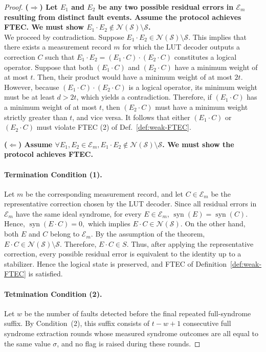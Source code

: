 \begin{proof}
\textbf{($\Rightarrow$) 
Let $E_1$ and $E_2$ be any two possible residual errors in $\mathcal{E}_{m}$ resulting from distinct fault events. Assume the protocol achieves FTEC. We must show $E_1 \cdot E_2 \notin \mathcal{N(S)} \setminus \mathcal{S}$.}\\
We proceed by contradiction. Suppose $E_1 \cdot E_2 \in \mathcal{N(S)} \setminus \mathcal{S}$.  This implies that there exists a measurement record $m$ for which the LUT decoder outputs a correction $C$ such that $E_1 \cdot E_2 = (E_1 \cdot C) \cdot (E_2 \cdot C)$ constitutes a logical operator. Suppose that both $(E_1 \cdot C)$ and $(E_2 \cdot C)$ have a minimum weight of at most $t$. Then, their product would have a minimum weight of at most $2t$. However, because $(E_1 \cdot C) \cdot (E_2 \cdot C)$ is a logical operator, its minimum weight must be at least $d > 2t$, which yields a contradiction. Therefore, if $(E_1 \cdot C)$ has a minimum weight of at most $t$, then $(E_2 \cdot C)$ must have a minimum weight strictly greater than $t$, and vice versa. It follows that either $(E_1 \cdot C)$ or $(E_2 \cdot C)$ must violate FTEC (2) of Def.~\ref{def:weak-FTEC}.

\textbf{($\Leftarrow$) 
Assume $\forall E_1 , E_2 \in \mathcal{E}_m,  E_1 \cdot E_2 \notin  \mathcal{N(S)} \setminus \mathcal{S}$. We must show the protocol achieves FTEC.}
\paragraph{Termination Condition (1).}
Let $m$ be the corresponding
    measurement record, and let $C\in\mathcal{E}_m$ be the representative
    correction chosen by the LUT decoder.
    Since all residual errors in $\mathcal{E}_m$ have the same ideal syndrome,
    for every $E\in\mathcal{E}_m$,
    $\operatorname{syn}(E)=\operatorname{syn}(C)$.
    Hence, $\operatorname{syn}(E\cdot C)=0,$ which implies $E\cdot C\in \mathcal{N}(\mathcal{S}).$
    On the other hand, both $E$ and $C$ belong to $\mathcal{E}_m$. By the
    assumption of the theorem, $E \cdot C \in \mathcal{N}(\mathcal{S}) \setminus \mathcal{S}$. 
    Therefore, $E \cdot C\in S$.
    Thus, after applying the representative correction, every possible residual
    error is equivalent to the identity up to a stabilizer. Hence the logical
    state is preserved, and FTEC of Definition~\ref{def:weak-FTEC} is satisfied.
        
\paragraph{Tetmination Condition (2).}
Let $w$ be the number of faults detected
before the final repeated full-syndrome suffix.  By Condition~(2), this suffix
consists of $t-w+1$ consecutive full syndrome extraction rounds whose measured
syndrome outcomes are all equal to the same value $\sigma$, and no flag is
raised during these rounds.


\end{proof}
